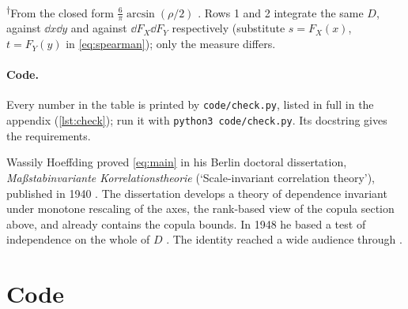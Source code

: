 \documentclass{saim-blog}
\begin{document}
\textsuperscript{$\dagger$}From the closed form $\tfrac6\pi\arcsin(\rho/2)$ \citep[not proved here; see][]{kruskal1958}. Rows 1 and 2 integrate the same $D$, against $\dd x\dd y$ and against $\dd F_X\dd F_Y$ respectively (substitute $s=F_X(x)$, $t=F_Y(y)$ in \eqref{eq:spearman}); only the measure differs.

\paragraph{Code.} Every number in the table is printed by \texttt{code/check.py}, listed in full in the appendix (\cref{lst:check}); run it with \texttt{python3 code/check.py}. Its docstring gives the requirements.

\SecNotes

Wassily Hoeffding proved \eqref{eq:main} in his Berlin doctoral dissertation, \emph{Ma{\ss}stabinvariante Korrelationstheorie} (`Scale-invariant correlation theory'), published in 1940 \citep{hoeffding1940}. The dissertation develops a theory of dependence invariant under monotone rescaling of the axes, the rank-based view of the copula section above, and already contains the copula bounds. In 1948 he based a test of independence on the whole of $D$ \citep{hoeffding1948}. The identity reached a wide audience through \citet{lehmann1966}.



{\let\SAIMplainauthors\ProjectAuthorsPlainDisplay
 \renewcommand{\ProjectAuthorsPlainDisplay}{\SAIMplainauthors\ProjectAuthorPostnominal}%
 \postauthorcard}

\clearpage
\appendix
\section{Code}

\end{document}

